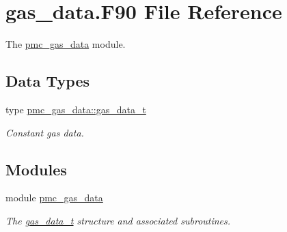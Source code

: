 \hypertarget{gas__data_8_f90}{}\section{gas\+\_\+data.\+F90 File Reference}
\label{gas__data_8_f90}


The \mbox{\hyperlink{namespacepmc__gas__data}{pmc\+\_\+gas\+\_\+data}} module.  


\subsection*{Data Types}
\begin{DoxyCompactItemize}
\item 
type \mbox{\hyperlink{structpmc__gas__data_1_1gas__data__t}{pmc\+\_\+gas\+\_\+data\+::gas\+\_\+data\+\_\+t}}
\begin{DoxyCompactList}\small\item\em Constant gas data. \end{DoxyCompactList}\end{DoxyCompactItemize}
\subsection*{Modules}
\begin{DoxyCompactItemize}
\item 
module \mbox{\hyperlink{namespacepmc__gas__data}{pmc\+\_\+gas\+\_\+data}}
\begin{DoxyCompactList}\small\item\em The \mbox{\hyperlink{structpmc__gas__data_1_1gas__data__t}{gas\+\_\+data\+\_\+t}} structure and associated subroutines. \end{DoxyCompactList}\end{DoxyCompactItemize}
